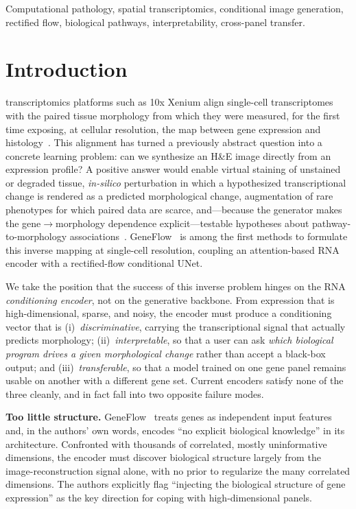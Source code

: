 \documentclass[journal]{IEEEtran}
\begin{document}
\begin{IEEEkeywords}
Computational pathology, spatial transcriptomics, conditional image generation,
rectified flow, biological pathways, interpretability, cross-panel transfer.
\end{IEEEkeywords}

\section{Introduction}
 transcriptomics platforms such as 10x Xenium align
single-cell transcriptomes with the paired tissue morphology from which they were
measured, for the first time exposing, at cellular resolution, the map between
gene expression and histology~\cite{geneflow,hest}. This alignment has turned a
previously abstract question into a concrete learning problem: can we synthesize
an H\&E image directly from an expression profile? A positive answer would
enable virtual staining of unstained or degraded tissue, \emph{in-silico}
perturbation in which a hypothesized transcriptional change is rendered as a
predicted morphological change, augmentation of rare phenotypes for which paired
data are scarce, and---because the generator makes the gene$\rightarrow$morphology
dependence explicit---testable hypotheses about pathway-to-morphology associations~\cite{geneflow,rnacdm}. GeneFlow~\cite{geneflow}
is among the first methods to formulate this inverse mapping at single-cell resolution, coupling
an attention-based RNA encoder with a rectified-flow conditional UNet.

We take the position that the success of this inverse problem hinges on the RNA
\emph{conditioning encoder}, not on the generative backbone. From expression that
is high-dimensional, sparse, and noisy, the encoder must produce a conditioning
vector that is (i)~\emph{discriminative}, carrying the transcriptional signal that
actually predicts morphology; (ii)~\emph{interpretable}, so that a user can ask
\emph{which biological program drives a given morphological change} rather than
accept a black-box output; and (iii)~\emph{transferable}, so that a model trained
on one gene panel remains usable on another with a different gene set. Current
encoders satisfy none of the three cleanly, and in fact fall into two opposite
failure modes.

\textbf{Too little structure.} GeneFlow~\cite{geneflow} treats genes as
independent input features and, in the authors' own words, encodes ``no explicit
biological knowledge'' in its architecture. Confronted with thousands of
correlated, mostly uninformative dimensions, the encoder must discover biological
structure largely from the image-reconstruction signal alone, with no prior to
regularize the many correlated dimensions. The authors explicitly flag ``injecting
the biological structure of gene expression'' as the key direction for coping
with high-dimensional panels.
\end{document}
